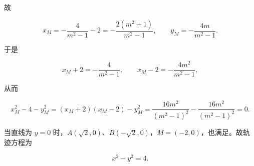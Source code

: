 \begin{answer}
故

\nopagebreak[4]
\[x_M=-\frac{4}{m^2-1}-2=-\frac{2(m^2+1)}{m^2-1},\qquad y_M=-\frac{4m}{m^2-1}.\]

于是

\nopagebreak[4]
\[x_M+2=-\frac{4}{m^2-1},\qquad x_M-2=-\frac{4m^2}{m^2-1},\]

从而

\nopagebreak[4]
\[x_M^2-4-y_M^2=(x_M+2)(x_M-2)-y_M^2
=\frac{16m^2}{(m^2-1)^2}-\frac{16m^2}{(m^2-1)^2}=0 .\]

当直线为 $y=0$ 时，$A(\sqrt2,0)$、$B(-\sqrt2,0)$，$M=(-2,0)$，也满足。故轨迹方程为

\nopagebreak[4]
\[x^2-y^2=4 .\]


\end{answer}
